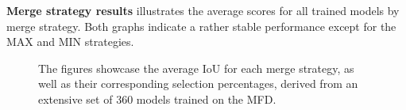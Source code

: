\textbf{Merge strategy results}\newline
{} illustrates the average scores for all trained models by merge strategy. Both graphs indicate a rather stable performance except for the MAX and MIN strategies.
\begin{figure}[H]%
  \centering
  \caption[Average IoU for Each Merge Strategy (Medaka)]{The figures showcase the average \ac{IoU} for each merge strategy, as well as their corresponding selection percentages, derived from an extensive set of 360 models trained on the \ac{MFD}.}
  \label{merge_strategy_results_medaka_short}
\end{figure}

